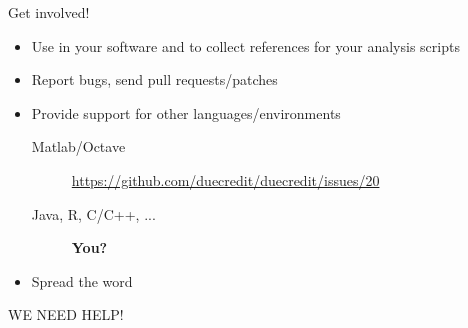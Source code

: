 \begin{frame}
  {Get involved!}
  \begin{itemize}
    \item Use in your software and to collect references for your analysis scripts
    \item Report bugs, send pull requests/patches
    \item Provide support for other languages/environments
      \begin{description}
      \item[Matlab/Octave]
        \url{https://github.com/duecredit/duecredit/issues/20}
      \item[Java, R, C/C++, ...] \textbf{You?}
      \end{description}
    \item Spread the word
    \end{itemize}
    \begin{center}
    \vspace{4mm}
    \alert{\Huge WE NEED HELP!}
  \end{center}
\end{frame}


